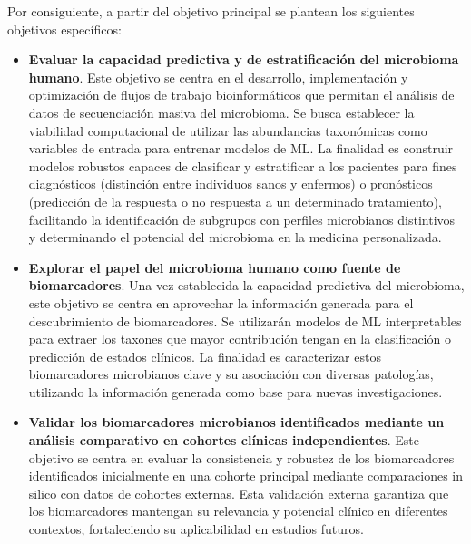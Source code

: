 Por consiguiente, a partir del objetivo principal se plantean los siguientes objetivos específicos:
\begin{itemize}

    \item \textbf{Evaluar la capacidad predictiva y de estratificación del microbioma humano}. Este objetivo se centra en el desarrollo, implementación y optimización de flujos de trabajo bioinformáticos que permitan el análisis de datos de secuenciación masiva del microbioma. Se busca establecer la viabilidad computacional de utilizar las abundancias taxonómicas como variables de entrada para entrenar modelos de ML. La finalidad es construir modelos robustos capaces de clasificar y estratificar a los pacientes para fines diagnósticos (distinción entre individuos sanos y enfermos) o pronósticos (predicción de la respuesta o no respuesta a un determinado tratamiento), facilitando la identificación de subgrupos con perfiles microbianos distintivos y determinando el potencial del microbioma en la medicina personalizada.
    
    \item \textbf{Explorar el papel del microbioma humano como fuente de biomarcadores}. Una vez establecida la capacidad predictiva del microbioma, este objetivo se centra en aprovechar la información generada para el descubrimiento de biomarcadores. Se utilizarán modelos de ML interpretables para extraer los taxones que mayor contribución tengan en la clasificación o predicción de estados clínicos. La finalidad es caracterizar estos biomarcadores microbianos clave y su asociación con diversas patologías, utilizando la información generada como base para nuevas investigaciones.

    \item \textbf{Validar los biomarcadores microbianos identificados mediante un análisis comparativo en cohortes clínicas independientes}. Este objetivo se centra en evaluar la consistencia y robustez de los biomarcadores identificados inicialmente en una cohorte principal mediante comparaciones in silico con datos de cohortes externas. Esta validación externa garantiza que los biomarcadores mantengan su relevancia y potencial clínico en diferentes contextos, fortaleciendo su aplicabilidad en estudios futuros.
    
\end{itemize}